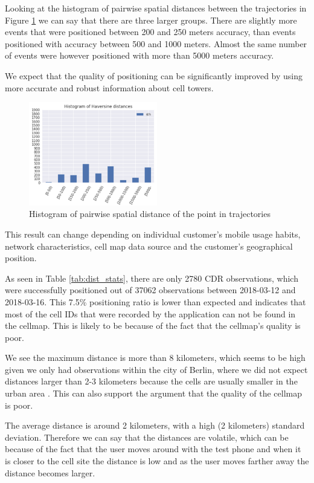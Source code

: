 Looking at the histogram of pairwise spatial distances between the trajectories in Figure \ref{fig:hist} we can say that there are three larger groups. There are slightly more events that were positioned between 200 and 250 meters accuracy, than events positioned with accuracy between 500 and 1000 meters. Almost the same number of events were however positioned with more than 5000 meters accuracy.

We expect that the quality of positioning can be significantly improved by using more accurate and robust information about cell towers.

\begin{figure}[h]
    \centering
    \includegraphics[width=0.5\textwidth]{images/hist.png}
    \caption{Histogram of pairwise spatial distance of the point in trajectories}
    \label{fig:hist}
\end{figure}

This result can change depending on individual customer's mobile usage habits, network characteristics, cell map data source and the customer's geographical position.

As seen in Table \ref{tab:dist_stats}, there are only 2780 CDR observations, which were successfully positioned out of 37062 observations between 2018-03-12 and 2018-03-16. This 7.5\% positioning ratio is lower than expected and indicates that most of the cell IDs that were recorded by the application can not be found in the cellmap. This is likely to be because of the fact that the cellmap's quality is poor.

We see the maximum distance is more than 8 kilometers, which seems to be high given we only had observations within the city of Berlin, where we did not expect distances larger than 2-3 kilometers because the cells are usually smaller in the urban area \cite{cell-site}. This can also support the argument that the quality of the cellmap is poor.

The average distance is around 2 kilometers, with a high (2 kilometers) standard deviation. Therefore we can say that the distances are volatile, which can be because of the fact that the user moves around with the test phone and when it is closer to the cell site the distance is low and as the user moves farther away the distance becomes larger.

